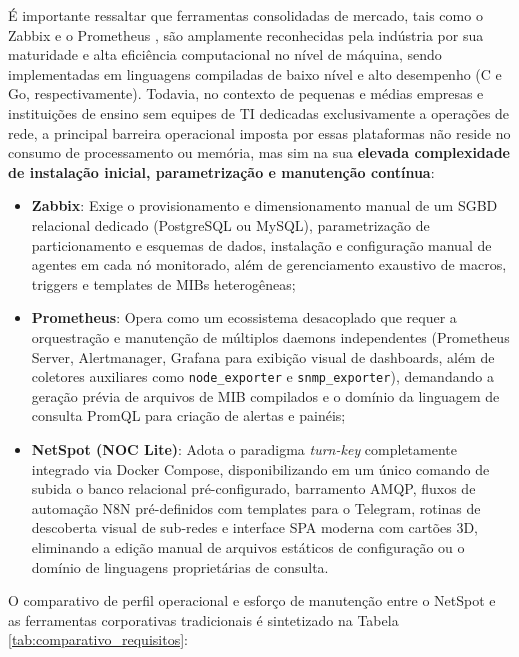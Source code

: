 \documentclass[12pt,a4paper]{article}
\begin{document}
É importante ressaltar que ferramentas consolidadas de mercado, tais como o Zabbix \cite{zabbix2026manuals} e o Prometheus \cite{prometheus2026overview}, são amplamente reconhecidas pela indústria por sua maturidade e alta eficiência computacional no nível de máquina, sendo implementadas em linguagens compiladas de baixo nível e alto desempenho (C e Go, respectivamente). Todavia, no contexto de pequenas e médias empresas e instituições de ensino sem equipes de TI dedicadas exclusivamente a operações de rede, a principal barreira operacional imposta por essas plataformas não reside no consumo de processamento ou memória, mas sim na sua \textbf{elevada complexidade de instalação inicial, parametrização e manutenção contínua}:
\begin{itemize}[leftmargin=1.25cm]
\item \textbf{Zabbix}: Exige o provisionamento e dimensionamento manual de um SGBD relacional dedicado (PostgreSQL ou MySQL), parametrização de particionamento e esquemas de dados, instalação e configuração manual de agentes em cada nó monitorado, além de gerenciamento exaustivo de macros, triggers e templates de MIBs heterogêneas;
\item \textbf{Prometheus}: Opera como um ecossistema desacoplado que requer a orquestração e manutenção de múltiplos daemons independentes (Prometheus Server, Alertmanager, Grafana para exibição visual de dashboards, além de coletores auxiliares como \texttt{node\_exporter} e \texttt{snmp\_exporter}), demandando a geração prévia de arquivos de MIB compilados e o domínio da linguagem de consulta PromQL para criação de alertas e painéis;
\item \textbf{NetSpot (NOC Lite)}: Adota o paradigma \textit{turn-key} completamente integrado via Docker Compose, disponibilizando em um único comando de subida o banco relacional pré-configurado, barramento AMQP, fluxos de automação N8N pré-definidos com templates para o Telegram, rotinas de descoberta visual de sub-redes e interface SPA moderna com cartões 3D, eliminando a edição manual de arquivos estáticos de configuração ou o domínio de linguagens proprietárias de consulta.
\end{itemize}

O comparativo de perfil operacional e esforço de manutenção entre o NetSpot e as ferramentas corporativas tradicionais é sintetizado na Tabela \ref{tab:comparativo_requisitos}:
\end{document}
